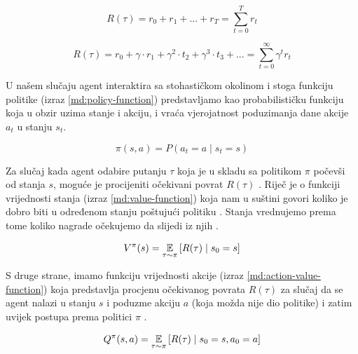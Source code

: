 \begin{equation}
    \label{md:undiscounted-return}
    R(\tau) = r_0 + r_1 + ... + r_T = \sum_{t=0}^{T}r_t
\end{equation}

\begin{equation}
    \label{md:discounted-return}
    R(\tau) = r_0 + \gamma \cdot r_1 + \gamma^2 \cdot t_2 + \gamma^3 \cdot t_3 + ... = \sum_{t=0}^{\infty}\gamma^t r_t
\end{equation}

\bigskip

U našem slučaju agent interaktira sa stohastičkom okolinom i stoga funkciju politike  (izraz \ref{md:policy-function}) predstavljamo kao probabilističku funkciju koja u obzir uzima stanje i akciju, i vraća vjerojatnost poduzimanja dane akcije $a_t$ u stanju $s_t$.

\begin{equation}
    \label{md:policy-function}
    \pi(s, a) = P(a_t = a \mid s_t = s)
\end{equation}

\bigskip

Za slučaj kada agent odabire putanju $\tau$ koja je u skladu sa politikom $\pi$ počevši od stanja $s$, moguće je procijeniti očekivani povrat $R(\tau)$ \cite{PodUceFer}. Riječ je o funkciji vrijednosti stanja  (izraz \ref{md:value-function}) koja nam u suštini govori koliko je dobro biti u određenom stanju poštujući politiku \cite{SpinningUp}. Stanja vrednujemo prema tome koliko nagrade očekujemo da slijedi iz njih \cite{PodUceFer}.

\begin{equation}
    \label{md:value-function}
    V^{\pi}(s) = \operatorname*{\mathbb{E}}_{\tau \sim \pi} \left[ {R(\tau) \mid s_0 = s} \right]
\end{equation}

\bigskip

S druge strane, imamo funkciju vrijednosti akcije  (izraz \ref{md:action-value-function}) \cite{SpinningUp} koja predstavlja procjenu očekivanog povrata $R(\tau)$ za slučaj da se agent nalazi u stanju $s$ i poduzme akciju $a$ (koja možda nije dio politike) i zatim uvijek postupa prema politici $\pi$ \cite{PodUceFer}.

\begin{equation}
    \label{md:action-value-function}
    Q^{\pi}(s,a) = \operatorname*{\mathbb{E}}_{\tau \sim \pi} \left[ {R(\tau) \mid s_0 = s, a_0 = a} \right]
\end{equation}

